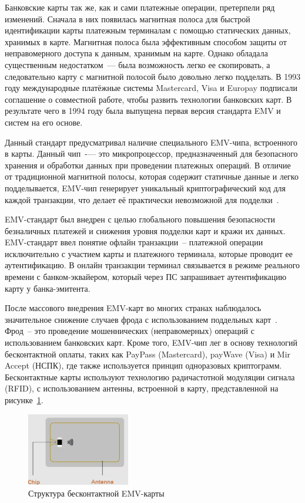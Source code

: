 Банковские карты так же, как и сами платежные операции, претерпели ряд изменений.
Сначала в них появилась магнитная полоса для быстрой идентификации карты платежным терминалам с помощью статических данных, хранимых в карте.
Магнитная полоса была эффективным способом защиты от неправомерного доступа к данным, хранимым на карте.
Однако обладала существенным недостатком~--- была возможность легко ее скопировать, а следовательно карту с магнитной полосой было довольно легко подделать.
В 1993 году международные платёжные системы Mastercard, Visa и Europay подписали соглашение о совместной работе, чтобы развить технологии банковских карт.
В результате чего в 1994 году была выпущена первая версия стандарта EMV и систем на его основе.

Данный стандарт предусматривал наличие специального EMV-чипа, встроенного в карты.
Данный чип~-— это микропроцессор, предназначенный для безопасного хранения и обработки данных при проведении платежных операций.
В отличие от традиционной магнитной полосы, которая содержит статичные данные и легко подделывается, EMV-чип генерирует уникальный криптографический код для каждой транзакции, что делает её практически невозможной для подделки~\cite{emv_specifications_book}.

EMV-стандарт был внедрен с целью глобального повышения безопасности безналичных платежей и снижения уровня подделки карт и кражи их данных.
EMV-стандарт ввел понятие офлайн транзакции~-- платежной операции исключительно с участием карты и платежного терминала, которые проводит ее аутентификацию.
В онлайн транзакции терминал связывается в режиме реального времени с банком-эквайером, который через ПС запрашивает аутентификацию карту у банка-эмитента.

После массового внедрения EMV-карт во многих странах наблюдалось значительное снижение случаев фрода с использованием поддельных карт~\cite{plas_emv_fraud}.
Фрод~-- это проведение мошеннических (неправомерных) операций с использованием банковских карт.
Кроме того, EMV-чип лег в основу технологий бесконтактной оплаты, таких как PayPass (Mastercard), payWave (Visa) и Mir Accept (НСПК), где также используется принцип одноразовых криптограмм.
Бесконтактные карты используют технологию радичастотной модуляции сигнала (RFID), с использованием антенны, встроенной в карту, представленной на рисунке~\ref{fig:emv_card}.

\begin{figure}[H]
    \centering
    \includegraphics[width=0.4\textwidth]{images/research/emv_card}
    \caption{\centering Структура бесконтактной EMV-карты}
    \label{fig:emv_card}
\end{figure}

